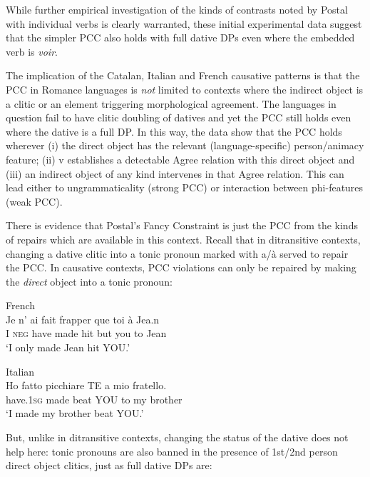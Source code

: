\documentclass[output=paper,colorlinks,citecolor=brown,nonflat]{./langscibook}
\begin{document}
While further empirical investigation of the kinds of contrasts noted by Postal with individual verbs is clearly warranted, these initial experimental data suggest that the simpler PCC also holds with full dative DPs even where the embedded verb is \textit{voir}. 

The implication of the Catalan, Italian and French causative patterns is that the PCC in Romance languages is \textit{not} limited to contexts where the indirect object is a clitic or an element triggering morphological agreement. The languages in question fail to have clitic doubling of datives and yet the PCC still holds even where the dative is a full DP. In this way, the data show that the PCC holds wherever (i) the direct object has the relevant (language-specific) person/animacy feature; (ii) v establishes a detectable Agree relation with this direct object and (iii) an indirect object of any kind intervenes in that Agree relation. This can lead either to ungrammaticality (strong PCC) or interaction between phi-features (weak PCC).  

There is evidence that Postal’s Fancy Constraint is just the PCC from the kinds of repairs which are available in this context. Recall that in ditransitive contexts, changing a dative clitic into a tonic pronoun marked with a/à served to repair the PCC. In causative contexts, PCC violations can only be repaired by making the \textit{direct} object into a tonic pronoun:

\ea%
    \label{ex:sheehan:26}
    French\\
    \gll    Je   n’  ai   fait   frapper   que   toi   à   Jea.n\\
            I   \textsc{neg}   have   made   hit   but   you   to   Jean\\
    \glt    ‘I only made Jean hit YOU.’
\z

\ea%
    \label{ex:sheehan:27}
    Italian\\
    \gll    Ho       fatto   picchiare   TE  a  mio  fratello.\\
            have.\textsc{1sg}   made   beat      YOU  to  my  brother\\
    \glt    ‘I made my brother beat YOU.’
\z

But, unlike in ditransitive contexts, changing the status of the dative does not help here: tonic pronouns are also banned in the presence of 1st/2nd person direct object clitics, just as full dative DPs are:
\end{document}
